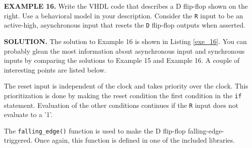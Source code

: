 \begin{leftbar}
\begin{minipage}{0.5\linewidth}
\noindent
\textbf{EXAMPLE 16.}
Write the VHDL code that describes a D flip-flop shown on the right. Use a behavioral model in your description. Consider the \texttt{R} input to be an active-high, asynchronous input that resets the \texttt{D} flip-flop outputs when asserted.
\end{minipage}
\begin{minipage}{0.47\linewidth}
\begin{flushright}
\end{flushright}
\end{minipage}
\end{leftbar}
\noindent
\textbf{SOLUTION.} The solution to Example 16 is shown in Listing \ref{exe_16}. You can probably glean the most information about asynchronous input and synchronous inputs by comparing the solutions to Example 15 and Example 16. A couple of interesting points are listed below. 
\begin{my_list}
\item The reset input is independent of the clock and takes priority over the clock. This prioritization is done by making the reset condition the first condition in the \texttt{if} statement. Evaluation of the other conditions continues if the \texttt{R} input does not evaluate to a '1'.
\item The \texttt{falling\_edge()} function is used to make the D flip-flop falling-edge-triggered. Once again, this function is defined in one of the included libraries. 
\end{my_list}

